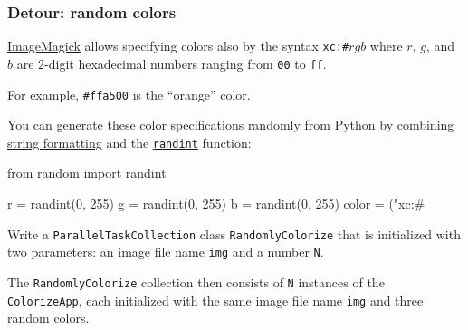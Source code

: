 \documentclass[english,serif,mathserif,xcolor=pdftex,dvipsnames,table]{beamer}
\begin{document}
\begin{frame}[fragile]
  \frametitle{Detour: random colors}

  \href{http://www.imagemagick.org/script/color.php}{ImageMagick}
  allows specifying colors also by the syntax \texttt{xc:\#}$rgb$ where
  $r$, $g$, and $b$ are 2-digit hexadecimal numbers ranging from
  \texttt{00} to \texttt{ff}.

  \+
  For example, \texttt{\#ffa500} is the ``orange'' color.

  \+ You can generate these color specifications randomly from Python
  by combining \href{https://pyformat.info/}{string formatting} and the
  \href{https://docs.python.org/2/library/random.html#random.randint}{\texttt{randint}}
  function:
\begin{python}
  from random import randint

  r = randint(0, 255)
  g = randint(0, 255)
  b = randint(0, 255)
  color = ("xc:#%
\end{python}
\end{frame}


\begin{frame}
\begin{exercise*}[9.A]
  Write a \texttt{ParallelTaskCollection} class
  \texttt{RandomlyColorize} that is initialized with two parameters:
  an image file name \texttt{img} and a number \texttt{N}.

  \+
  The \texttt{RandomlyColorize} collection then consists of
  \texttt{N} instances of the \texttt{ColorizeApp}, each initialized
  with the same image file name \texttt{img} and three random colors.
\end{exercise*}
\end{frame}
\end{document}
